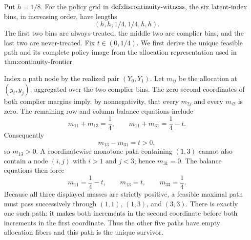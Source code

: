 Put \(h=1/8\).  For the policy grid in \(\textnormal{def:discontinuity-witness}\), the six latent-index bins, in increasing order, have lengths
\[
(h,h,1/4,1/4,h,h).
\]
The first two bins are always-treated, the middle two are complier bins, and the last two are never-treated.  Fix \(t\in(0,1/4)\).  We first derive the unique feasible path and its complete policy image from the allocation representation used in \(\textnormal{thm:continuity-frontier}\).

Index a path node by the realized pair \((Y_0,Y_1)\).  Let \(m_{ij}\) be the allocation at \((y_i,y_j)\), aggregated over the two complier bins.  The zero second coordinates of both complier margins imply, by nonnegativity, that every \(m_{2j}\) and every \(m_{i2}\) is zero.  The remaining row and column balance equations include
\[
m_{11}+m_{13}=\frac14,
\qquad
m_{11}+m_{31}=\frac14-t.
\]
Consequently
\[
m_{13}-m_{31}=t>0,
\]
so \(m_{13}>0\).  A coordinatewise monotone path containing \((1,3)\) cannot also contain a node \((i,j)\) with \(i>1\) and \(j<3\); hence \(m_{31}=0\).  The balance equations then force
\[
m_{11}=\frac14-t,
\qquad
m_{13}=t,
\qquad
m_{33}=\frac14.
\]
Because all three displayed masses are strictly positive, a feasible maximal path must pass successively through \((1,1)\), \((1,3)\), and \((3,3)\).  There is exactly one such path: it makes both increments in the second coordinate before both increments in the first coordinate.  Thus the other five paths have empty allocation fibers and this path is the unique survivor.

